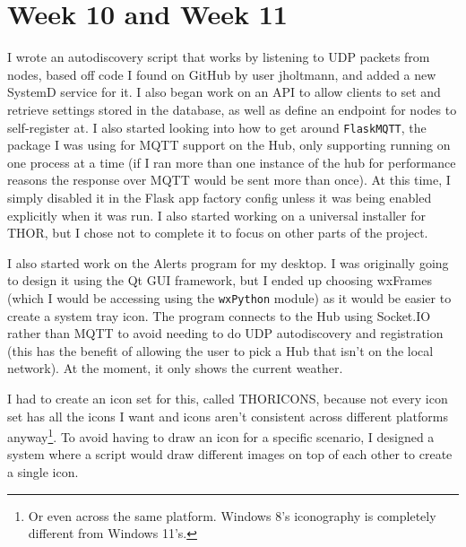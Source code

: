 \documentclass{report}
\begin{document}
	\section{Week 10 and Week 11} %
		I wrote an autodiscovery script that works by listening to UDP packets from nodes, based off code I found on GitHub by user jholtmann, and added a new SystemD service for it. I also began work on an API to allow clients to set and retrieve settings stored in the database, as well as define an endpoint for nodes to self-register at. I also started looking into how to get around \texttt{FlaskMQTT}, the package I was using for MQTT support on the Hub, only supporting running on one process at a time (if I ran more than one instance of the hub for performance reasons the response over MQTT would be sent more than once). At this time, I simply disabled it in the Flask app factory config unless it was being enabled explicitly when it was run. I also started working on a universal installer for THOR, but I chose not to complete it to focus on other parts of the project. 
		
		I also started work on the Alerts program for my desktop. I was originally going to design it using the Qt GUI framework, but I ended up choosing wxFrames (which I would be accessing using the \texttt{wxPython} module) as it would be easier to create a system tray icon. The program connects to the Hub using Socket.IO rather than MQTT to avoid needing to do UDP autodiscovery and registration (this has the benefit of allowing the user to pick a Hub that isn't on the local network). At the moment, it only shows the current weather. 
		
		I had to create an icon set for this, called THORICONS, because not every icon set has all the icons I want and icons aren't consistent across different platforms anyway\footnote{Or even across the same platform. Windows 8's iconography is completely different from Windows 11's.}. To avoid having to draw an icon for a specific scenario, I designed a system where a script would draw different images on top of each other to create a single icon.
		
\end{document}
